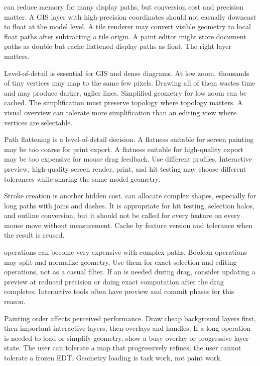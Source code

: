  can reduce memory for many display paths, but conversion cost and precision matter. A GIS layer with high-precision coordinates should not casually downcast to float at the model level. A tile renderer may convert visible geometry to local float paths after subtracting a tile origin. A paint editor might store document paths as double but cache flattened display paths as float. The right layer matters.

Level-of-detail is essential for GIS and dense diagrams. At low zoom, thousands of tiny vertices may map to the same few pixels. Drawing all of them wastes time and may produce darker, uglier lines. Simplified geometry for low zoom can be cached. The simplification must preserve topology where topology matters. A visual overview can tolerate more simplification than an editing view where vertices are selectable.

Path flattening is a level-of-detail decision. A flatness suitable for screen painting may be too coarse for print export. A flatness suitable for high-quality export may be too expensive for mouse drag feedback. Use different profiles. Interactive preview, high-quality screen render, print, and hit testing may choose different tolerances while sharing the same model geometry.

Stroke creation is another hidden cost.  can allocate complex shapes, especially for long paths with joins and dashes. It is appropriate for hit testing, selection halos, and outline conversion, but it should not be called for every feature on every mouse move without measurement. Cache by feature version and tolerance when the result is reused.

 operations can become very expensive with complex paths. Boolean operations may split and normalize geometry. Use them for exact selection and editing operations, not as a casual filter. If an  is needed during drag, consider updating a preview at reduced precision or doing exact computation after the drag completes. Interactive tools often have preview and commit phases for this reason.

Painting order affects perceived performance. Draw cheap background layers first, then important interactive layers, then overlays and handles. If a long operation is needed to load or simplify geometry, show a busy overlay or progressive layer state. The user can tolerate a map that progressively refines; the user cannot tolerate a frozen EDT. Geometry loading is task work, not paint work.

